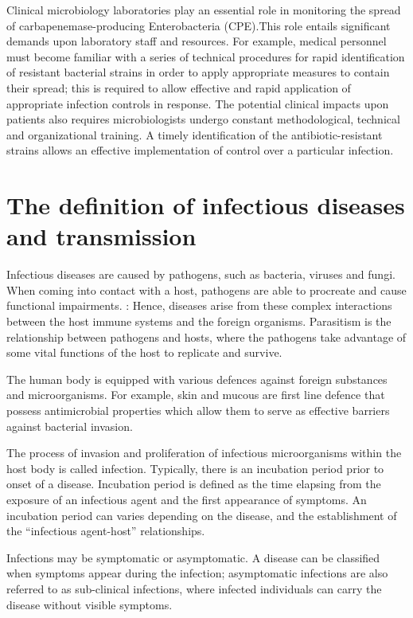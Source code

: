 \documentclass[11pt]{report}
\begin{document}
Clinical microbiology laboratories play an essential role in monitoring the spread of carbapenemase-producing Enterobacteria (CPE).This role entails significant demands upon laboratory staff and resources. For example, medical personnel must become familiar with a series of technical procedures for rapid identification of resistant bacterial strains in order to apply appropriate measures to contain their spread; this is required to allow effective and rapid application of appropriate infection controls in response. The potential clinical impacts upon patients also requires microbiologists undergo constant methodological, technical and organizational training. A timely identification of the antibiotic-resistant strains allows an effective implementation of control over a particular infection.

\section{The definition of infectious diseases and transmission}
Infectious diseases are caused by pathogens, such as bacteria, viruses and fungi. When coming into contact with a host, pathogens are able to procreate and cause functional impairments. :  Hence,  diseases arise from these complex interactions between the host immune systems and the foreign organisms. Parasitism is the relationship between pathogens and hosts, where the pathogens take advantage of some vital functions of the host to replicate and survive. 

The human body is equipped with various defences against foreign substances and microorganisms. For example, skin and mucous are first line defence that possess antimicrobial properties which allow them to serve as effective barriers against bacterial invasion.

The process of invasion and proliferation of infectious microorganisms within the host body is called infection. Typically, there is an incubation period prior to onset of a disease. Incubation period is defined as the time elapsing from the exposure of an infectious agent and the first appearance of symptoms.  An incubation period can varies depending on the disease, and the establishment of the “infectious agent-host” relationships.

Infections may be symptomatic or asymptomatic. A disease can be classified when symptoms appear during the infection; asymptomatic infections are also referred to as sub-clinical infections, where infected individuals can carry the disease without visible symptoms.
\end{document}

